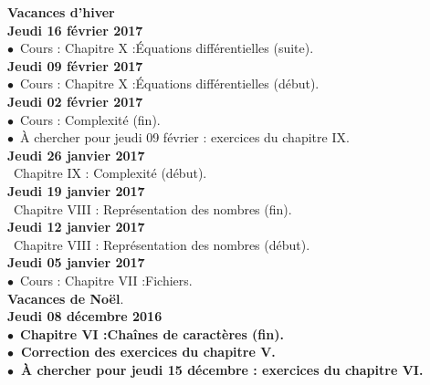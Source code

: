 \documentclass[12pt,a4paper]{article}
\begin{document}
\noindent\textbf{\bf Vacances d'hiver\vspace{.4cm} }\\

\noindent\textbf{\bf Jeudi 16 février 2017 \rm}\\
$\bullet$\ Cours : Chapitre X :\rm Équations différentielles (suite).
\vspace{.4cm}\\

\noindent\textbf{\bf Jeudi 09 février 2017 \rm}\\
$\bullet$\ Cours : Chapitre X :\rm Équations différentielles (début).
\vspace{.4cm}\\

\noindent\textbf{\bf Jeudi 02 février 2017 \rm}\\
$\bullet$\ Cours : Complexité (fin).\\
$\bullet$\ À chercher pour jeudi 09 février : exercices du chapitre IX.
\vspace{.4cm}\\

\noindent\textbf{\bf Jeudi 26 janvier 2017 \rm}\\
\bu\ Chapitre IX : Complexité (début).\vspace{.4cm}\\

\noindent\textbf{\bf Jeudi 19 janvier 2017 \rm}\\
\bu\ Chapitre VIII : Représentation des nombres (fin).\vspace{.4cm}\\

\noindent\textbf{\bf Jeudi 12 janvier 2017 \rm}\\
\bu\ Chapitre VIII : Représentation des nombres (début).\vspace{.4cm}\\

\noindent\textbf{\bf Jeudi 05 janvier 2017 \rm}\\
$\bullet$\ Cours : Chapitre VII :\rm Fichiers.\vspace{.4cm}\\
 
\noindent\textbf{\bf Vacances de Noël}.\vspace{.4cm}\\

\noindent\textbf{\bf Jeudi 08 décembre 2016 \rm}\\
$\bullet$\ \bf Chapitre VI :\rm Chaînes de caractères (fin).\\
$\bullet$\ Correction des exercices du chapitre V.\\
$\bullet$\ À chercher pour jeudi 15 décembre : exercices du chapitre VI.
\vspace{.4cm}\\
  
\end{document}
